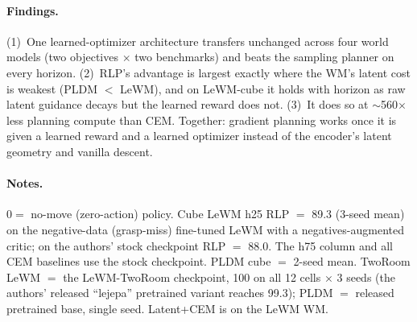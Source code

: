 \documentclass{article}
\begin{document}
\paragraph{Findings.} (1)~One learned-optimizer architecture transfers unchanged
across four world models (two objectives $\times$ two benchmarks) and beats the
sampling planner on every horizon. (2)~RLP's advantage is largest exactly where
the WM's latent cost is weakest (PLDM $<$ LeWM), and on LeWM-cube it holds with
horizon as raw latent guidance decays but the learned reward does not. (3)~It
does so at $\sim$560$\times$ less planning compute than CEM. Together: gradient
planning works once it is given a learned reward and a learned optimizer instead
of the encoder's latent geometry and vanilla descent.

\paragraph{Notes.} $0=$ no-move (zero-action) policy. Cube LeWM h25 RLP $=$
89.3 (3-seed mean) on the negative-data (grasp-miss) fine-tuned LeWM with a
negatives-augmented critic; on the authors' stock checkpoint RLP $=$ 88.0. The
h75 column and all CEM baselines use the stock checkpoint. PLDM cube $=$ 2-seed
mean. TwoRoom LeWM $=$ the LeWM-TwoRoom checkpoint, 100 on all 12 cells
$\times$ 3 seeds (the authors' released ``lejepa'' pretrained variant reaches
99.3); PLDM $=$ released pretrained base, single seed. Latent+CEM is on the
LeWM WM.
\end{document}

